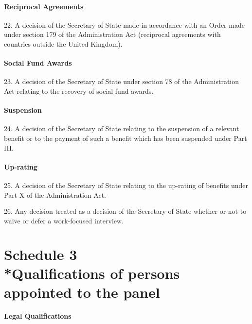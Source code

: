 \documentclass[12pt,a4paper]{article}
\begin{document}
\subsection*{Reciprocal Agreements}

22.  A decision of the Secretary of State made in accordance with an Order made under section 179 of the Administration Act (reciprocal agreements with countries outside the United Kingdom).

\subsection*{Social Fund Awards}

23.  A decision of the Secretary of State under section 78 of the Administration Act relating to the recovery of social fund awards.

\subsection*{Suspension}

24.  A decision of the Secretary of State relating to the suspension of a relevant benefit or to the payment of such a benefit which has been suspended under Part III.

\subsection*{Up-rating}

25.  A decision of the Secretary of State relating to the up-rating of benefits under Part X of the Administration Act.

26.  Any decision treated as a decision of the Secretary of State whether or not to waive or defer a work-focused interview.


\part[Schedule 3 --- Qualifications of persons appointed to the panel]{Schedule 3\\*Qualifications of persons appointed to the panel}

\subsection*{Legal Qualifications}
\end{document}
